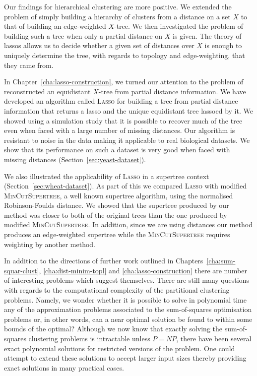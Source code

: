Our findings for hierarchical clustering are more positive.  We extended the
problem of simply building a hierarchy of clusters from a distance on a set
$X$ to that of building an edge-weighted $X$-tree.  We then investigated the
problem of building such a tree when only a partial distance on $X$ is given.
The theory of lassos allows us to decide whether a given set of distances over
$X$ is enough to uniquely determine the tree, with regards to topology and
edge-weighting, that they came from.

In Chapter~\ref{cha:lasso-construction}, we turned our attention to the
problem of reconstructed an equidistant $X$-tree from partial distance
information.  We have developed an algorithm called \textsc{Lasso} for
building a tree from partial distance information that returns a lasso and the
unique equidistant tree lassoed by it.  We showed using a simulation study
that it is possible to recover much of the tree even when faced with a large
number of missing distances.  Our algorithm is resistant to noise in the data
making it applicable to real biological datasets.  We show that its
performance on such a dataset is very good when faced with missing distances
(Section~\ref{sec:yeast-dataset}).

We also illustrated the applicability of \textsc{Lasso} in a supertree context
(Section~\ref{sec:wheat-dataset}).  As part of this we compared \textsc{Lasso}
with modified \textsc{MinCutSupertree}, a well known supertree algorithm,
using the normalised Robinson-Foulds distance.  We showed that the supertree
produced by our method was closer to both of the original trees than the one
produced by modified \textsc{MinCutSupertree}.  In addition, since we are
using distances our method produces an edge-weighted supertree while the
\textsc{MinCutSupertree} requires weighting by another method.

In addition to the directions of further work outlined in
Chapters~\ref{cha:sum-squar-clust}, \ref{cha:dist-minim-topl} and
\ref{cha:lasso-construction} there are number of interesting problems which
suggest themselves.  There are still many questions with regards to the
computational complexity of the partitional clustering problems.  Namely, we
wonder whether it is possible to solve in polynomial time any of the
approximation problems associated to the sum-of-squares optimisation problems
or, in other words, can a near optimal solution be found to within some bounds
of the optimal?  Although we now know that exactly solving the sum-of-squares
clustering problems is intractable unless $P=NP$, there have been several
exact polynomial solutions for restricted versions of the problem.  One could
attempt to extend these solutions to accept larger input sizes thereby
providing exact solutions in many practical cases.

